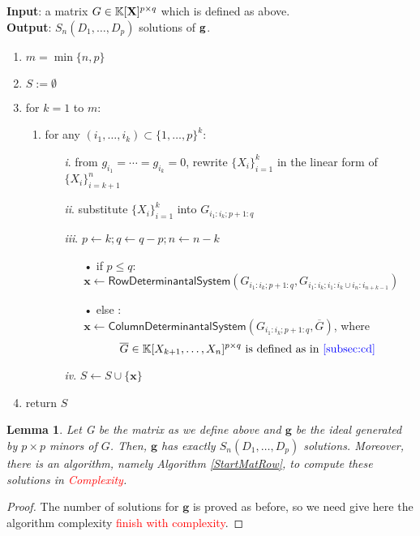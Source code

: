\documentclass[11pt]{article}
\numberwithin{Property}{section}
\numberwithin{Theorem}{section}
\numberwithin{Proposition}{section}
\newtheorem{Lemma}{Lemma}%
\numberwithin{Lemma}{section}
\numberwithin{Corollary}{section}
\numberwithin{Definition}{section}
\numberwithin{Remark}{section}
\numberwithin{Conjecture}{section}
\numberwithin{Problem}{section}
\numberwithin{Claim}{section}
\theoremstyle{definition}
\numberwithin{Example}{section}
\def\g {\ensuremath{\mathbf{g}}}
\renewcommand{\leq}{\leqslant}
\def\bar{\overline}
\newcommand{\field}{\mathbb{K}} %
\newcommand{\mat}[1]{\mathbf{\MakeUppercase{#1}}} %
\newcommand{\todo}[1]{\textcolor{red}{#1}} %
\newcommand{\improve}[1]{\textcolor{blue}{#1}} %
\begin{document}
\begin{algorithm}[]
\caption{$\mathsf{Start Matrix Row Degrees}$}
\label{StartMatRow}
{\bf Input}: a matrix $G \in \field[\mat{X}]^{p \times q}$ which is defined as above.\\
{\bf Output}: $S_{n}(D_1, \ldots, D_p)$ solutions of ${\bf g}$.
\begin{enumerate}
\item $m = \min \{n,p\}$
\item $S := \emptyset$
\item for $k = 1$ to $m$: 
\begin{enumerate}
\item for any  $(i_1, \ldots, i_k) \subset \{1, \ldots, p\}^k$:
\begin{itemize}
\item[\emph{i}.] from $g_{i_1} = \cdots = g_{i_k} = 0$, rewrite $\{X_i\}_{i = 1}^k$ in the linear form of $\{X_{i}\}_{i=k+1}^n$
\item[\emph{ii}.] substitute $\{X_i\}_{i = 1}^k$ into $G_{i_1:i_k\mathbf{;}p+1:q}$
\item[\emph{iii}.] $p \gets k; q \gets q-p; n \gets n - k$
\begin{itemize}
\item[•] if $p \leq q$:\\ \hspace{1cm} $\mathbf{x} \gets \mathsf{RowDeterminantal System}(G_{i_1:i_k\mathbf{;}p+1:q}, G_{i_1:i_k;i_1:i_k \cup i_{n}:i_{n+k-1}})$
\item[•] else :\\ \quad $\mathbf{x} \gets \mathsf{ColumnDeterminantal System}(G_{i_1:i_k\mathbf{;}p+1:q},\bar{G})$, where 
\[\bar{G} \in \field[X_{k+1}, \ldots, X_n]^{p \times q} \ \mathrm{is \ defined \ as \ in \ \improve{\cref{subsec:cd}}} \ \] 
\end{itemize}
\item[\emph{iv}.] $S \gets S \cup \{\mathbf{x}\}$
\end{itemize}
\end{enumerate}
\item return $S$
\end{enumerate} 
\end{algorithm}

\begin{Lemma}\label{P3} Let G be the matrix as we define above and $\g$ be the ideal generated by $p \times p$ minors of $G$. Then, $\g$ has exactly $S_{n}(D_1, \ldots, D_p)$ solutions. Moreover, there is an algorithm, namely Algorithm \ref{StartMatRow}, to compute these solutions in \todo{Complexity}. 
\end{Lemma}
\begin{proof}
The number of solutions for $\g$ is proved as before, so we need give here the algorithm complexity \todo{finish with complexity}.  
\end{proof}
\end{document}
